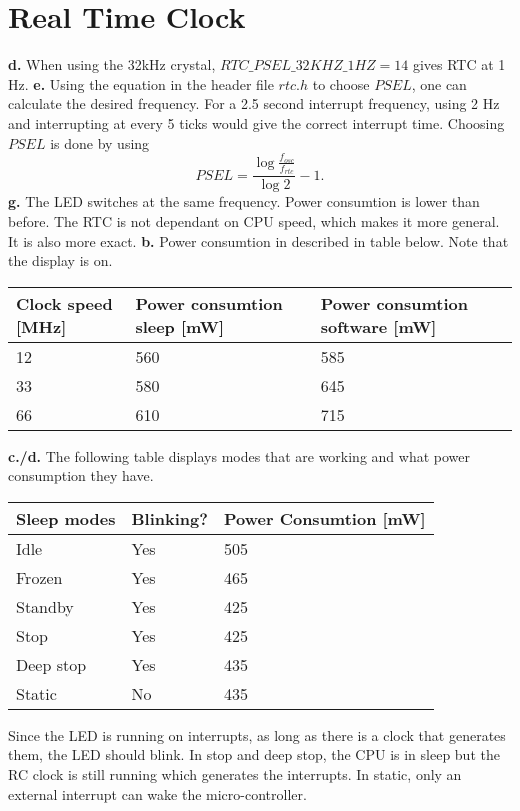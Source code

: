 \documentclass[10pt, a4paper]{article}
\begin{document}
\section{Real Time Clock}
\textbf{d.} When using the 32kHz crystal, $RTC\_PSEL\_32KHZ\_1HZ = 14$ gives RTC
at 1 Hz.
\newline
\textbf{e.} Using the equation in the header file $rtc.h$ to choose $PSEL$, one
can calculate the desired frequency. For a 2.5 second interrupt frequency, using
2 Hz and interrupting at every 5 ticks would give the correct interrupt time.
Choosing $PSEL$ is done by using
\begin{equation}
    PSEL = \frac{\log{\frac{f_{osc}} {f_{rtc}}}} {\log{2}}-1.
\end{equation}
\newline
\textbf{g.} The LED switches at the same frequency. Power consumtion is lower
than before. The RTC is not dependant on CPU speed, which makes it more general.
It is also more exact.
\newline
\textbf{b.} Power consumtion in described in table below. Note that the display
is on.
\begin{table}[H]
    \centering
    \begin{tabular}{l | l l}
        Clock speed [MHz] & Power consumtion sleep [mW] & Power consumtion
        software [mW]\\
        \hline
        12 & 560 & 585 \\
        \hline
        33 & 580 & 645 \\
        \hline
        66 & 610 & 715 \\
    \end{tabular}
\end{table}
\textbf{c./d.} The following table displays modes that are working and what
power consumption they have.
\begin{table}[H]
    \centering
    \begin{tabular}{l | l l}
        Sleep modes & Blinking? & Power Consumtion [mW]\\
        \hline
        Idle & Yes & 505 \\
        \hline
        Frozen & Yes & 465 \\
        \hline
        Standby & Yes & 425 \\
        \hline
        Stop & Yes & 425 \\
        \hline
        Deep stop & Yes & 435 \\
        \hline
        Static & No & 435 \\
    \end{tabular}
\end{table}
Since the LED is running on interrupts, as long as there is a clock that
generates them, the LED should blink. In stop and deep stop, the CPU is in sleep
but the RC clock is still running which generates the interrupts. In static,
only an external interrupt can wake the micro-controller.
\end{document}
